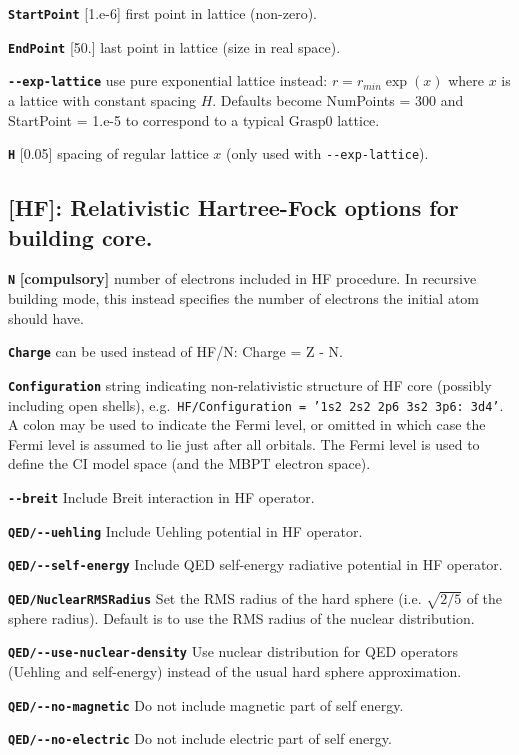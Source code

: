 \documentclass[a4paper,11pt]{article}
\newcommand{\option}[1]{\smallskip\noindent\textbf{\texttt{#1}}}
\begin{document}
\option{StartPoint} [1.e-6] first point in lattice (non-zero).

\option{EndPoint} [50.] last point in lattice (size in real space).

\option{-{}-exp-lattice} use pure exponential lattice instead: $r = r_{min}\exp(x)$ where $x$ is a lattice with constant spacing $H$. Defaults become NumPoints = 300 and StartPoint = 1.e-5 to correspond to a typical Grasp0 lattice.

\option{H} [0.05] spacing of regular lattice $x$ (only used with \texttt{-{}-exp-lattice}).

\subsection{[HF]: Relativistic Hartree-Fock options for building core.}

\option{N} \textbf{[compulsory]} number of electrons included in HF procedure. In recursive building mode, this instead specifies the number of electrons the initial atom should have.

\option{Charge} can be used instead of HF/N: Charge = Z - N.

\option{Configuration} string indicating non-relativistic structure of HF core (possibly including open shells), e.g.~\texttt{HF/Configuration = '1s2 2s2 2p6 3s2 3p6: 3d4'}. A colon may be used to indicate the Fermi level, or omitted in which case the Fermi level is assumed to lie just after all orbitals. The Fermi level is used to define the CI model space (and the MBPT electron space).

\option{-{}-breit} Include Breit interaction in HF operator.

\option{QED/-{}-uehling} Include Uehling potential in HF operator.

\option{QED/-{}-self-energy} Include QED self-energy radiative potential in HF operator.

\option{QED/NuclearRMSRadius} Set the RMS radius of the hard sphere (i.e. $\sqrt{2/5}$ of the sphere radius). Default is to use the RMS radius of the nuclear distribution.

\option{QED/-{}-use-nuclear-density} Use nuclear distribution for QED operators (Uehling and self-energy) instead of the usual hard sphere approximation.

\option{QED/-{}-no-magnetic} Do not include magnetic part of self energy.

\option{QED/-{}-no-electric} Do not include electric part of self energy.
\end{document}
